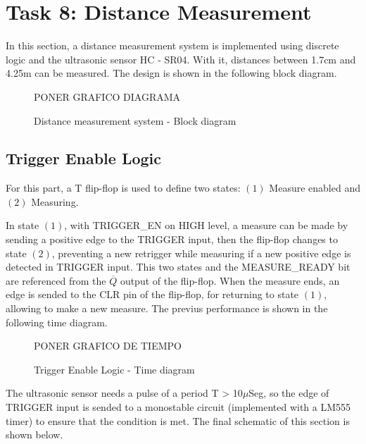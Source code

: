 

\section*{Task 8: Distance Measurement}
In this section, a distance measurement system is 
implemented using discrete logic and the ultrasonic 
sensor HC - SR04. With it, distances between 1.7cm 
and 4.25m can be measured. The design is shown in 
the following block diagram.

\begin{figure}[H]
    \begin{centering}
    PONER GRAFICO DIAGRAMA
    \par\end{centering}
    \caption{Distance measurement system - Block diagram}
\end{figure}

\subsection*{Trigger Enable Logic}
For this part, a T flip-flop is used to
define two states: $(1)$ Measure enabled and $(2)$ Measuring.
\par
In state $(1)$, with TRIGGER\_EN on HIGH level, a measure 
can be made by sending a positive edge to the TRIGGER input, 
then the flip-flop changes to state $(2)$, preventing a new 
retrigger while measuring if a new positive edge is detected 
in TRIGGER input. This two states and the MEASURE\_READY bit 
are referenced from the $\overline{Q}$ output of the flip-flop. 
When the measure ends, an edge is sended to 
the CLR pin of the flip-flop, for returning to state $(1)$, allowing
to make a new measure. The previus performance is shown in the 
following time diagram.

\begin{figure}[H]
    \begin{centering}
        PONER GRAFICO DE TIEMPO
    \par\end{centering}
    \caption{Trigger Enable Logic - Time diagram}
\end{figure}

The ultrasonic sensor needs a pulse of a period T > 10$\mu$Seg, 
so the edge of TRIGGER input is sended to a monostable circuit
(implemented with a LM555 timer) to ensure that the condition is met.
The final schematic of this section is shown below.

